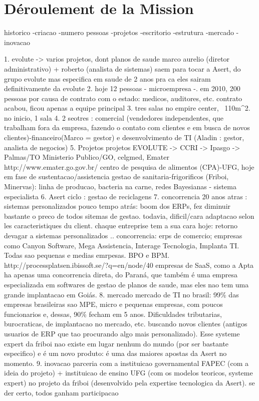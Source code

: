 \chapter{Déroulement de la Mission}



historico
-criacao
-numero pessoas
-projetos
-escritorio
-estrutura
-mercado
-inovacao

1. evolute -> varios projetos, dont planos de saude
	marco aurelio (diretor administrativo) + roberto (analista de sistemas) saem para tocar a Asert, do grupo evolute mas especifica em saude
	de 2 anos pra ca eles sairam definitivamente da evolute
2. hoje 12 pessoas - microempresa -. em 2010, 200 pessoas por causa de contrato com o estado: medicos, auditores, etc. contrato acabou, ficou apenas a equipe principal
3. tres salas no empire center, ~110m^2. no inicio, 1 sala
4. 2 seotres : comercial (vendedores independentes, que trabalham fora da empresa, fazendo o contato com clientes e em busca de novos clientes)-financeiro(Marco = gestor) e desenvolvimento de TI (Aladin : gestor, analista de negocios)
5. Projetos
	projetos EVOLUTE -> CCRI -> Ipasgo -> Palmas/TO 
	Ministerio Publico/GO, celgmed, Emater http://www.emater.go.gov.br/
	centro de pesquisa de alimentos (CPA)-UFG, hoje em fase de sustentacao/assistencia
	gestao de sanitaria-frigorificos (Friboi, Minervas): linha de producao, bacteria na carne, redes Bayesianas - sistema especialista
6. Asert ciclo : gestao de reciclagens
7. concorrencia
	20 anos atras : sistemas personalizados
	pouco tempo atrás: boom dos ERPs, fez diminuir bastante o preco de todos sitemas de gestao. todavia, dificil/cara adaptacao selon les caracteristiques du client. chaque entreprise tem a sua cara
	hoje: retorno devagar a sistemas personalizados
	.. concorrencia: 
		erps de comercio; empresas como Canyon Software, Mega Assistencia, Interage Tecnologia, Implanta TI. Todas sao pequenas e medias emrpesas.
		BPO e BPM. http://processplatsen.ibissoft.se/?q=en/node/40
		empresas de SaaS, como a Apta
		ha apenas uma concorrencia direta, do Paraná, que também é uma empresa especializada em softwares de gestao de planos de saude, mas eles nao tem uma grande implantacao em Goiás.
8. mercado
	mercado de TI no brasil: 99\% das empresas brasileiras sao MPE, micro e pequenas empresas, com poucos funcionarios e, dessas, 90\% fecham em 5 anos. Dificuldades tributarias, burocraticas, de implantacao no mercado, etc.
	buscando novos clientes (antigos usuarios de ERP que tao procurando algo mais personalizado). Esse systeme expert da friboi nao existe em lugar nenhum do mundo (por ser bastante especifico) e é um novo produto: é uma das maiores apostas da Asert no momento.
9. inovacao
	parceria com a instituicao governamental FAPEC (com a ideia do projeto) + instituicao de ensino UFG (com os modelos teoricos, systeme expert) no projeto da friboi (desenvolvido pela expertise tecnologica da Asert). se der certo, todos ganham participacao
